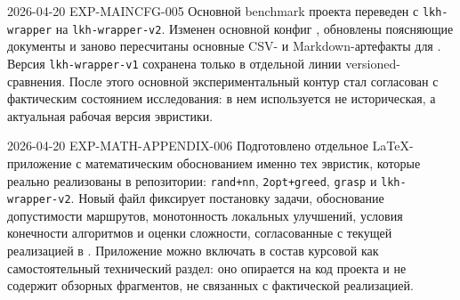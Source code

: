 \ExperimentEntry
  {2026-04-20}
  {EXP-MAINCFG-005}
  {Основной benchmark проекта переведен с \texttt{lkh-wrapper} на \texttt{lkh-wrapper-v2}.}
  {Изменен основной конфиг , обновлены поясняющие документы и заново пересчитаны основные CSV- и Markdown-артефакты для . Версия \texttt{lkh-wrapper-v1} сохранена только в отдельной линии versioned-сравнения.}
  {После этого основной экспериментальный контур стал согласован с фактическим состоянием исследования: в нем используется не историческая, а актуальная рабочая версия эвристики.}

\ExperimentEntry
  {2026-04-20}
  {EXP-MATH-APPENDIX-006}
  {Подготовлено отдельное LaTeX-приложение с математическим обоснованием именно тех эвристик, которые реально реализованы в репозитории: \texttt{rand+nn}, \texttt{2opt+greed}, \texttt{grasp} и \texttt{lkh-wrapper-v2}.}
  {Новый файл  фиксирует постановку задачи, обоснование допустимости маршрутов, монотонность локальных улучшений, условия конечности алгоритмов и оценки сложности, согласованные с текущей реализацией в .}
  {Приложение можно включать в состав курсовой как самостоятельный технический раздел: оно опирается на код проекта и не содержит обзорных фрагментов, не связанных с фактической реализацией.}
